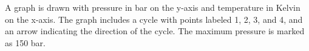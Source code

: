 A graph is drawn with pressure in bar on the y-axis and temperature in Kelvin on the x-axis. The graph includes a cycle with points labeled 1, 2, 3, and 4, and an arrow indicating the direction of the cycle. The maximum pressure is marked as 150 bar.